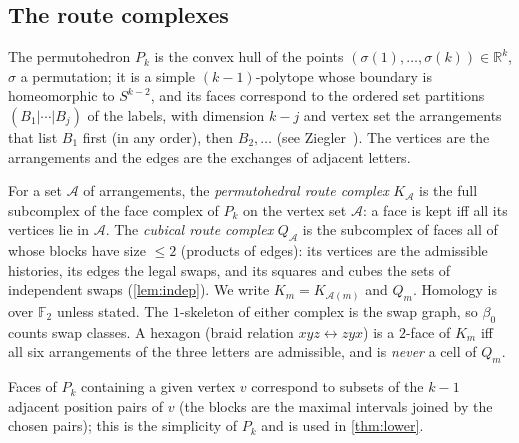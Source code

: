 \subsection{The route complexes}
The permutohedron $P_k$ is the convex hull of the points $(\sigma(1),\dots,\sigma(k))\in\mathbb R^k$, $\sigma$ a permutation; it is a simple $(k-1)$-polytope whose boundary is homeomorphic to $S^{k-2}$, and its faces correspond to the ordered set partitions $(B_1|\cdots|B_j)$ of the labels, with dimension $k-j$ and vertex set the arrangements that list $B_1$ first (in any order), then $B_2,\dots$ (see Ziegler~\cite[Example~0.10]{Ziegler1995}). The vertices are the arrangements and the edges are the exchanges of adjacent letters.
\begin{definition}\label{def:routecx}
For a set $\mathcal A$ of arrangements, the \emph{permutohedral route complex} $K_{\mathcal A}$ is the full subcomplex of the face complex of $P_k$ on the vertex set $\mathcal A$: a face is kept iff all its vertices lie in $\mathcal A$. The \emph{cubical route complex} $Q_{\mathcal A}$ is the subcomplex of faces all of whose blocks have size $\le2$ (products of edges): its vertices are the admissible histories, its edges the legal swaps, and its squares and cubes the sets of independent swaps (\cref{lem:indep}). We write $K_m=K_{\mathcal A(m)}$ and $Q_m$. Homology is over $\mathbb F_2$ unless stated. The $1$-skeleton of either complex is the swap graph, so $\beta_0$ counts swap classes. A hexagon (braid relation $xyz\leftrightarrow zyx$) is a $2$-face of $K_m$ iff all six arrangements of the three letters are admissible, and is \emph{never} a cell of $Q_m$.
\end{definition}
\begin{remark}
Faces of $P_k$ containing a given vertex $v$ correspond to subsets of the $k-1$ adjacent position pairs of $v$ (the blocks are the maximal intervals joined by the chosen pairs); this is the simplicity of $P_k$ and is used in \cref{thm:lower}.
\end{remark}

